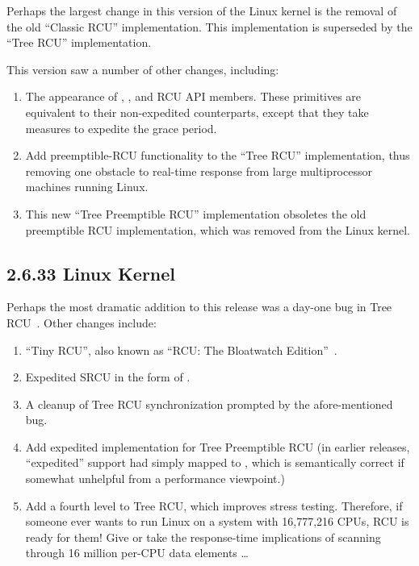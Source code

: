 Perhaps the largest change in this version of the Linux kernel
is the removal of the old ``Classic RCU'' implementation.
This implementation is superseded by the ``Tree RCU'' implementation.

This version saw a number of other changes, including:

\begin{enumerate}
\item	The appearance of ,
	, and
	 RCU API members.
	These primitives are equivalent to their non-expedited
	counterparts, except that they take measures to expedite the
	grace period.
\item	Add preemptible-RCU functionality to the ``Tree RCU''
	implementation, thus removing one obstacle to real-time
	response from large multiprocessor machines running Linux.
\item	This new ``Tree Preemptible RCU'' implementation obsoletes
	the old preemptible RCU implementation, which was removed
	from the Linux kernel.
\end{enumerate}

\subsection{2.6.33 Linux Kernel}

Perhaps the most dramatic addition to this release was
a day-one bug in Tree RCU~\cite{PaulEMcKenney2009HuntingHeisenbugs}.
Other changes include:

\begin{enumerate}
\item	``Tiny RCU'', also known as ``RCU: The Bloatwatch
	Edition''~\cite{PaulEMcKenney2009LWNBloatWatchRCU}.
\item	Expedited SRCU in the form of
	.
\item	A cleanup of Tree RCU synchronization prompted by the
	afore-mentioned bug.
\item	Add expedited implementation for Tree Preemptible RCU
	(in earlier releases, ``expedited'' support had simply
	mapped to , which is semantically
	correct if somewhat unhelpful from a performance viewpoint.)
\item	Add a fourth level to Tree RCU, which improves stress testing.
	Therefore, if someone ever wants to run Linux on a system with
	16,777,216 CPUs, RCU is ready for them!
	Give or take the response-time implications of scanning
	through 16 million per-CPU data elements \ldots
\end{enumerate}

